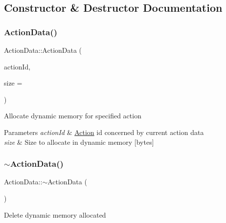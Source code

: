 \subsection{Constructor \& Destructor Documentation}
\mbox{\label{class_m210_1_1_action_data_ad6cfcb4e00155902b01e889c189fec0d}} 
\subsubsection{\texorpdfstring{Action\+Data()}{ActionData()}}
{\footnotesize\ttfamily Action\+Data\+::\+Action\+Data (\begin{DoxyParamCaption}\item[{\mbox{\hyperlink{class_m210_1_1_action_data_a35cd47f396d015ad523e845ddfaeab4c}{Action\+Id}}}]{action\+Id,  }\item[{size\+\_\+t}]{size = {} }\end{DoxyParamCaption})\hspace{0.3cm}{\ttfamily [explicit]}}

Allocate dynamic memory for specified action 
\begin{DoxyParams}{Parameters}
{\em action\+Id} & \mbox{\hyperlink{class_m210_1_1_action}{Action}} id concerned by current action data \\
\hline
{\em size} & Size to allocate in dynamic memory \mbox{[}bytes\mbox{]} \\
\hline
\end{DoxyParams}
\mbox{\label{class_m210_1_1_action_data_a5ecfc6f8a7f284d5430e9a59bbe399b7}} 
\subsubsection{\texorpdfstring{$\sim$\+Action\+Data()}{~ActionData()}}
{\footnotesize\ttfamily Action\+Data\+::$\sim$\+Action\+Data (\begin{DoxyParamCaption}{ }\end{DoxyParamCaption})}

Delete dynamic memory allocated 

